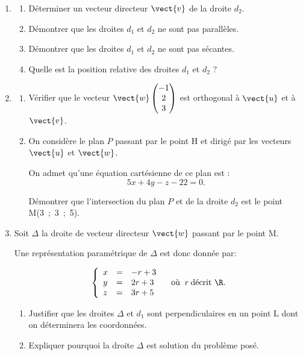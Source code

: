 \begin{enumerate}
\item
	\begin{enumerate}
		\item Déterminer un vecteur directeur $\vect{v}$ de la droite $d_2$. 
		\item Démontrer que les droites $d_1$ et $d_2$ ne sont pas parallèles. 
		\item Démontrer que les droites $d_1$ et $d_2$  ne sont pas sécantes. 
		\item Quelle est la position relative des droites $d_1$ et $d_2$ ?
	\end{enumerate}
\item 
	\begin{enumerate}
		\item Vérifier que le vecteur $\vect{w}\begin{pmatrix}-1\\2\\3\end{pmatrix}$ est orthogonal à $\vect{u}$ et à $\vect{v}$.
		\item On considère le plan $P$ passant par le point H et dirigé par les vecteurs $\vect{u}$ et $\vect{w}$.
		
On admet qu'une équation cartésienne de ce plan est :
\[5x + 4y - z - 22 = 0.\]

Démontrer que l'intersection du plan $P$ et de la droite $d_2$ est le point M(3~;~3~;~5).
	\end{enumerate}
\item Soit $\Delta$ la droite de vecteur directeur $\vect{w}$ passant par le point M. 

Une représentation paramétrique de $\Delta$ est donc donnée par:

\[\left\{\begin{array}{l c l}
x &=&- r + 3 \\
y &= &2r + 3\\
z &=& 3r + 5
\end{array}\right. \quad \text{où }\:r\: \text{décrit }\R.\]

	\begin{enumerate}
		\item Justifier que les droites $\Delta$ et $d_1$ sont perpendiculaires
en un point L dont on déterminera les coordonnées.
		\item Expliquer pourquoi la droite $\Delta$ est solution du problème posé.
	\end{enumerate}
\end{enumerate}

\bigskip
